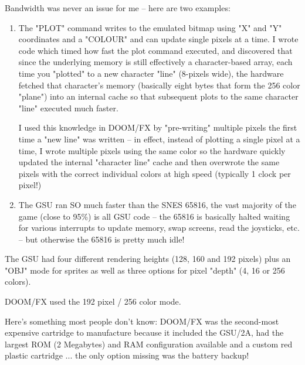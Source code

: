 {\par
 Bandwidth was never an issue for me -- here are two examples:
\begin{enumerate}
\item       The "PLOT" command writes to the emulated bitmap using "X" and "Y" coordinates and a "COLOUR" and can update single pixels at a time.  I wrote code which timed how fast the plot command executed, and discovered that since the underlying memory is still effectively a character-based array, each time you "plotted" to a new character "line" (8-pixels wide), the hardware fetched that character's memory (basically eight bytes that form the 256 color "plane") into an internal cache so that subsequent plots to the same character "line" executed much faster.


I used this knowledge in DOOM/FX by "pre-writing" multiple pixels the first time a "new line" was written -- in effect, instead of plotting a single pixel at a time, I wrote multiple pixels using the same color so the hardware quickly updated the internal "character line" cache and then overwrote the same pixels with the correct individual colors at high speed (typically 1 clock per pixel!)

 

\item       The GSU ran SO much faster than the SNES 65816, the vast majority of the game (close to 95\%) is all GSU code -- the 65816 is basically halted waiting for various interrupts to update memory, swap screens, read the joysticks, etc. -- but otherwise the 65816 is pretty much idle!
\end{enumerate}
 

The GSU had four different rendering heights (128, 160 and 192 pixels) plus an "OBJ" mode for sprites as well as three options for pixel "depth" (4, 16 or 256 colors).\\
\par
 DOOM/FX used the 192 pixel / 256 color mode.\\
\par
 Here's something most people don't know: DOOM/FX was the second-most expensive cartridge to manufacture because it included the GSU/2A, had the largest ROM (2 Megabytes) and RAM configuration available and a custom red plastic cartridge ... the only option missing was the battery backup!}















